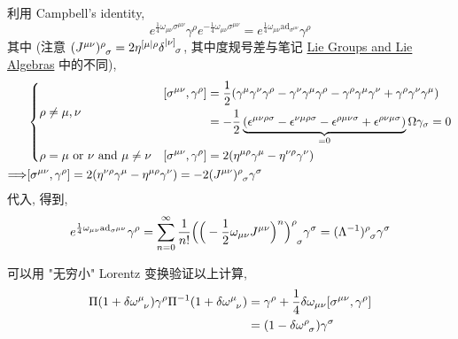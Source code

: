 \begin{itemize}
	\begin{tcolorbox}[title=calculation:]
		利用 Campbell's identity,
		\begin{equation}
			e^{\frac{1}{4} \omega_{\mu \nu} \sigma^{\mu \nu}} \gamma^\rho e^{- \frac{1}{4} \omega_{\mu \nu} \sigma^{\mu \nu}} = e^{\frac{1}{4} \omega_{\mu \nu} \mathrm{ad}_{\sigma^{\mu \nu}}} \gamma^\rho
		\end{equation}
		其中 (注意 $\tensor{(J^{\mu \nu})}{^\rho_\sigma} = 2 \eta^{[\mu| \rho} \tensor{\delta}{^{|\nu]}_\sigma}$, 其中度规号差与笔记 \href{https://github.com/siyang03/my-note---Lie-Groups-and-Lie-Algebras}{Lie Groups and Lie Algebras} 中的不同),
			\begin{align}
			& \begin{dcases}
				\rho \neq \mu, \nu & \begin{aligned}
					[\sigma^{\mu \nu}, \gamma^\rho] &= \frac{1}{2} (\gamma^\mu \gamma^\nu \gamma^\rho - \gamma^\nu \gamma^\mu \gamma^\rho - \gamma^\rho \gamma^\mu \gamma^\nu + \gamma^\rho \gamma^\nu \gamma^\mu) \\
					&= - \frac{1}{2} \underbrace{(\epsilon^{\mu \nu \rho \sigma} - \epsilon^{\nu \mu \rho \sigma} - \epsilon^{\rho \mu \nu \sigma} + \epsilon^{\rho \nu \mu \sigma})}_{= 0} \Omega \gamma_\sigma = 0
				\end{aligned} \\
				\rho = \mu \ \text{or} \ \nu \ \text{and} \ \mu \neq \nu & [\sigma^{\mu \nu}, \gamma^\rho] = 2 (\eta^{\mu \rho} \gamma^\mu - \eta^{\nu \rho} \gamma^\nu)
			\end{dcases} \notag \\
			\Longrightarrow & [\sigma^{\mu \nu}, \gamma^\rho] = 2 (\eta^{\nu \rho} \gamma^\mu - \eta^{\mu \rho} \gamma^\nu) = - 2 \tensor{(J^{\mu \nu})}{^\rho_\sigma} \gamma^\sigma
		\end{align}
		代入, 得到,
		\begin{equation}
			e^{\frac{1}{4} \omega_{\mu \nu} \mathrm{ad}_{\sigma^{\mu \nu}}} \gamma^\rho = \sum_{n = 0}^\infty \frac{1}{n!} \tensor{\Big( \Big( - \frac{1}{2} \omega_{\mu \nu} J^{\mu \nu} \Big)^n \Big)}{^\rho_\sigma} \gamma^\sigma = \tensor{(\Lambda^{- 1})}{^\rho_\sigma} \gamma^\sigma
		\end{equation}
		
		\noindent\hdashrule[0.5ex]{\linewidth}{0.5pt}{1mm} %
		
		可以用 "无穷小" Lorentz 变换验证以上计算,
		\begin{align}
			\Pi(1 + \delta \tensor{\omega}{^\mu_\nu}) \gamma^\rho \Pi^{- 1}(1 + \delta \tensor{\omega}{^\mu_\nu}) &= \gamma^\rho + \frac{1}{4} \delta \omega_{\mu \nu} [\sigma^{\mu \nu}, \gamma^\rho] \notag \\
			&= (1 - \delta \tensor{\omega}{^\rho_\sigma}) \gamma^\sigma
		\end{align}
	\end{tcolorbox}
\end{itemize}


